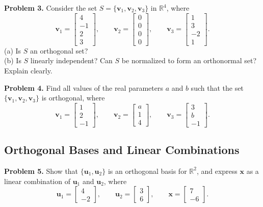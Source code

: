 \documentclass[11pt, letterpaper]{article}
\theoremstyle{definition}
\theoremstyle{remark}
\begin{document}
\textbf{Problem 3.} Consider the set $S = \{\mathbf{v}_1, \mathbf{v}_2, \mathbf{v}_3\}$ in $\mathbb{R}^4$, where
\[
\mathbf{v}_1 = \begin{bmatrix} 4 \\ -1 \\ 2 \\ 3 \end{bmatrix}, \qquad
\mathbf{v}_2 = \begin{bmatrix} 0 \\ 0 \\ 0 \\ 0 \end{bmatrix}, \qquad
\mathbf{v}_3 = \begin{bmatrix} 1 \\ 3 \\ -2 \\ 1 \end{bmatrix}.
\]
(a) Is $S$ an orthogonal set? \\
(b) Is $S$ linearly independent? Can $S$ be normalized to form an orthonormal set? Explain clearly.

\textbf{Problem 4.} Find all values of the real parameters $a$ and $b$ such that the set $\{\mathbf{v}_1, \mathbf{v}_2, \mathbf{v}_3\}$ is orthogonal, where
\[
\mathbf{v}_1 = \begin{bmatrix} 1 \\ 2 \\ -1 \end{bmatrix}, \qquad
\mathbf{v}_2 = \begin{bmatrix} a \\ 1 \\ 4 \end{bmatrix}, \qquad
\mathbf{v}_3 = \begin{bmatrix} 3 \\ b \\ -1 \end{bmatrix}.
\]

\subsection{Orthogonal Bases and Linear Combinations}

\textbf{Problem 5.} Show that $\{\mathbf{u}_1, \mathbf{u}_2\}$ is an orthogonal basis for $\mathbb{R}^2$, and express $\mathbf{x}$ as a linear combination of $\mathbf{u}_1$ and $\mathbf{u}_2$, where
\[
\mathbf{u}_1 = \begin{bmatrix} 4 \\ -2 \end{bmatrix}, \qquad
\mathbf{u}_2 = \begin{bmatrix} 3 \\ 6 \end{bmatrix}, \qquad
\mathbf{x} = \begin{bmatrix} 7 \\ -6 \end{bmatrix}.
\]
\end{document}

